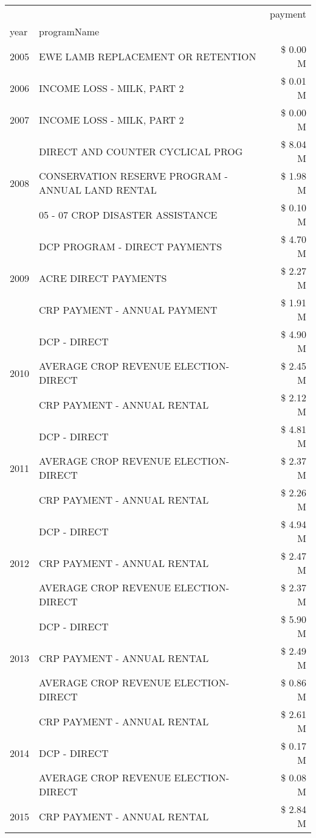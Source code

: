 \begin{tabular}{llr}
\toprule
 &  & payment \\
year & programName &  \\
\midrule
2005 & EWE LAMB REPLACEMENT OR RETENTION & \$ 0.00 M \\
\cline{1-3}
2006 & INCOME LOSS - MILK, PART 2 & \$ 0.01 M \\
\cline{1-3}
2007 & INCOME LOSS - MILK, PART 2 & \$ 0.00 M \\
\cline{1-3}
\multirow[t]{3}{*}{2008} & DIRECT AND COUNTER CYCLICAL PROG & \$ 8.04 M \\
 & CONSERVATION RESERVE PROGRAM - ANNUAL LAND RENTAL & \$ 1.98 M \\
 & 05 - 07 CROP DISASTER ASSISTANCE & \$ 0.10 M \\
\cline{1-3}
\multirow[t]{3}{*}{2009} & DCP PROGRAM - DIRECT PAYMENTS & \$ 4.70 M \\
 & ACRE DIRECT PAYMENTS & \$ 2.27 M \\
 & CRP PAYMENT - ANNUAL PAYMENT & \$ 1.91 M \\
\cline{1-3}
\multirow[t]{3}{*}{2010} & DCP - DIRECT & \$ 4.90 M \\
 & AVERAGE CROP REVENUE ELECTION-DIRECT & \$ 2.45 M \\
 & CRP PAYMENT - ANNUAL RENTAL & \$ 2.12 M \\
\cline{1-3}
\multirow[t]{3}{*}{2011} & DCP - DIRECT & \$ 4.81 M \\
 & AVERAGE CROP REVENUE ELECTION-DIRECT & \$ 2.37 M \\
 & CRP PAYMENT - ANNUAL RENTAL & \$ 2.26 M \\
\cline{1-3}
\multirow[t]{3}{*}{2012} & DCP - DIRECT & \$ 4.94 M \\
 & CRP PAYMENT - ANNUAL RENTAL & \$ 2.47 M \\
 & AVERAGE CROP REVENUE ELECTION-DIRECT & \$ 2.37 M \\
\cline{1-3}
\multirow[t]{3}{*}{2013} & DCP - DIRECT & \$ 5.90 M \\
 & CRP PAYMENT - ANNUAL RENTAL & \$ 2.49 M \\
 & AVERAGE CROP REVENUE ELECTION-DIRECT & \$ 0.86 M \\
\cline{1-3}
\multirow[t]{3}{*}{2014} & CRP PAYMENT - ANNUAL RENTAL & \$ 2.61 M \\
 & DCP - DIRECT & \$ 0.17 M \\
 & AVERAGE CROP REVENUE ELECTION-DIRECT & \$ 0.08 M \\
\cline{1-3}
\multirow[t]{3}{*}{2015} & CRP PAYMENT - ANNUAL RENTAL & \$ 2.84 M \\

\end{tabular}
